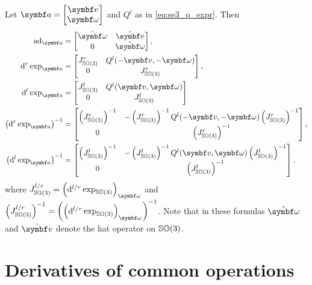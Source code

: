 \begin{properties}[title={Lowercase adjoint and exponential derivatives on $\SEthree$}]
  Let $\a = \begin{bmatrix} \bv \\ \bomega \end{bmatrix}$ and $Q^l$ as in \eqref{eq:se3_q_expr}. Then
  \begin{align}
    \ad_{\a}                                   & =  \begin{bmatrix}  \hat \bomega & \hat \bv \\ 0 & \hat \bomega \end{bmatrix},  \\
    \mathrm{d}^r \exp_{\a}                     & =   \begin{bmatrix} J^r_\SOthree & Q^l(-\bv, - \bomega) \\ 0 & J^r_\SOthree \end{bmatrix}, \\
    \mathrm{d}^l \exp_{\a}                     & = \begin{bmatrix} J^l_\SOthree & Q^l(\bv, \bomega) \\ 0 & J^l_\SOthree\end{bmatrix}    \\
    \left( \mathrm{d}^r \exp_{\a} \right)^{-1} & =  \begin{bmatrix} \left(J^r_\SOthree\right)^{-1}  &  -\left(J^r_\SOthree\right)^{-1} Q^l(-\bv, -\bomega)  \left(J^r_\SOthree\right)^{-1} \\ 0 &  \left(J^r_\SOthree\right)^{-1} \end{bmatrix},
    \\
    \left( \mathrm{d}^l \exp_{\a} \right)^{-1} & = \begin{bmatrix} \left(J^l_\SOthree\right)^{-1}  & -\left(J^l_\SOthree\right)^{-1} Q^l(\bv, \bomega)  \left(J^l_\SOthree\right)^{-1} \\ 0 &  \left(J^l_\SOthree\right)^{-1} \end{bmatrix} .
  \end{align}
  where $J^{l/r}_\SOthree = \left( \mathrm{d}^{l/r} \exp_{\SOthree} \right)_\bomega$ and $\left(J^{l/r}_\SOthree \right)^{-1} = \left( \left( \mathrm{d}^{l/r} \exp_{\SOthree} \right)_\bomega \right)^{-1}$. Note that in these formulas $\hat \bomega$ and $\hat \bv$ denote the hat operator on ${\mathbb{SO}(3)}$.
\end{properties}
\section{Derivatives of common operations}

